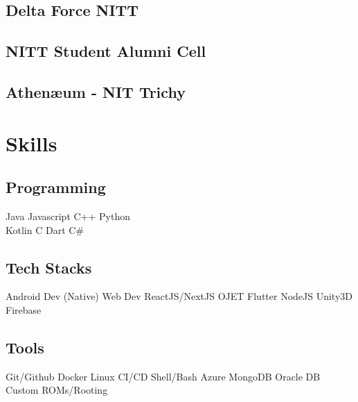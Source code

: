 \documentclass[]{deedy-resume-openfont}
\begin{document}
\begin{minipage}[t]{0.3\textwidth}
\subsection{Delta Force NITT}
\sectionsep

\subsection{NITT Student Alumni Cell}
\sectionsep

\subsection{Athenæum - NIT Trichy}
\sectionsep

\section{Skills}

\subsection{Programming}
Java  \textbullet{} Javascript C++ \textbullet{} Python  \\
Kotlin \textbullet{} C \textbullet{} Dart \textbullet{} C\# \\ 
\sectionsep

\subsection{Tech Stacks}
Android Dev (Native) \textbullet{}   Web Dev  ReactJS/NextJS \textbullet{} OJET
\textbullet{} Flutter  NodeJS  \textbullet{} Unity3D \textbullet{} Firebase 
\sectionsep

\subsection{Tools}
Git/Github  \textbullet{} Docker \textbullet{} Linux \textbullet{} CI/CD
\textbullet{} Shell/Bash \textbullet{} Azure \textbullet{} MongoDB \textbullet{} Oracle DB
\textbullet{} Custom ROMs/Rooting \\ 

\end{minipage} 
\end{document}
